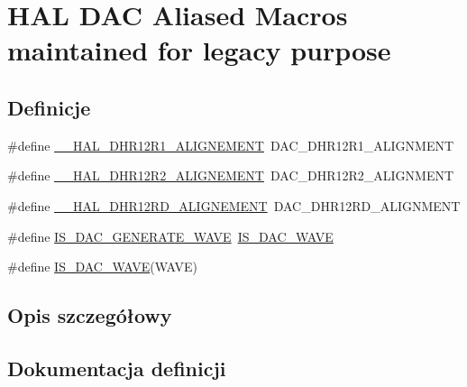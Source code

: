 \hypertarget{group___h_a_l___d_a_c___aliased___macros}{}\section{H\+AL D\+AC Aliased Macros maintained for legacy purpose}
\label{group___h_a_l___d_a_c___aliased___macros}
\subsection*{Definicje}
\begin{DoxyCompactItemize}
\item 
\#define \hyperlink{group___h_a_l___d_a_c___aliased___macros_ga354fd3b8705eea7292d4e4169497da60}{\+\_\+\+\_\+\+H\+A\+L\+\_\+\+D\+H\+R12\+R1\+\_\+\+A\+L\+I\+G\+N\+E\+M\+E\+NT}~D\+A\+C\+\_\+\+D\+H\+R12\+R1\+\_\+\+A\+L\+I\+G\+N\+M\+E\+NT
\item 
\#define \hyperlink{group___h_a_l___d_a_c___aliased___macros_ga2201f928be872705c094e047e49c4b82}{\+\_\+\+\_\+\+H\+A\+L\+\_\+\+D\+H\+R12\+R2\+\_\+\+A\+L\+I\+G\+N\+E\+M\+E\+NT}~D\+A\+C\+\_\+\+D\+H\+R12\+R2\+\_\+\+A\+L\+I\+G\+N\+M\+E\+NT
\item 
\#define \hyperlink{group___h_a_l___d_a_c___aliased___macros_ga32958593af3de40d27a9944ab91a7255}{\+\_\+\+\_\+\+H\+A\+L\+\_\+\+D\+H\+R12\+R\+D\+\_\+\+A\+L\+I\+G\+N\+E\+M\+E\+NT}~D\+A\+C\+\_\+\+D\+H\+R12\+R\+D\+\_\+\+A\+L\+I\+G\+N\+M\+E\+NT
\item 
\#define \hyperlink{group___h_a_l___d_a_c___aliased___macros_ga71522f902db10a227650387b90a0ae45}{I\+S\+\_\+\+D\+A\+C\+\_\+\+G\+E\+N\+E\+R\+A\+T\+E\+\_\+\+W\+A\+VE}~\hyperlink{group___h_a_l___d_a_c___aliased___macros_ga45c25065fb713820f6dbae0009376e1c}{I\+S\+\_\+\+D\+A\+C\+\_\+\+W\+A\+VE}
\item 
\#define \hyperlink{group___h_a_l___d_a_c___aliased___macros_ga45c25065fb713820f6dbae0009376e1c}{I\+S\+\_\+\+D\+A\+C\+\_\+\+W\+A\+VE}(W\+A\+VE)
\end{DoxyCompactItemize}


\subsection{Opis szczegółowy}


\subsection{Dokumentacja definicji}
\mbox{\label{group___h_a_l___d_a_c___aliased___macros_ga354fd3b8705eea7292d4e4169497da60}} 
